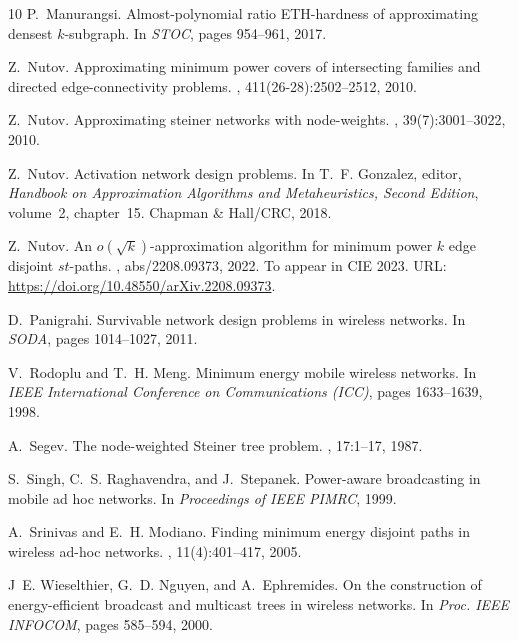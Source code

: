 \documentclass[a4paper,UKenglish,autoref]{lipics-v2019}
\begin{document}
\begin{thebibliography}{10}
P.~Manurangsi.
\newblock Almost-polynomial ratio {ETH}-hardness of approximating densest
  $k$-subgraph.
\newblock In {\em STOC}, pages 954--961, 2017.

Z.~Nutov.
\newblock Approximating minimum power covers of intersecting families and
  directed edge-connectivity problems.
, 411(26-28):2502--2512, 2010.

Z.~Nutov.
\newblock Approximating steiner networks with node-weights.
, 39(7):3001--3022, 2010.

Z.~Nutov.
\newblock Activation network design problems.
\newblock In T.~F. Gonzalez, editor, {\em Handbook on Approximation Algorithms
  and Metaheuristics, Second Edition}, volume~2, chapter~15. Chapman \&
  Hall/CRC, 2018.

Z.~Nutov.
\newblock An $o(\sqrt{k})$-approximation algorithm for minimum power $k$ edge
  disjoint $st$-paths.
, abs/2208.09373, 2022.
\newblock To appear in CIE 2023.
\newblock URL: \url{https://doi.org/10.48550/arXiv.2208.09373}.

D.~Panigrahi.
\newblock Survivable network design problems in wireless networks.
\newblock In {\em SODA}, pages 1014--1027, 2011.

V.~Rodoplu and T.~H. Meng.
\newblock Minimum energy mobile wireless networks.
\newblock In {\em IEEE International Conference on Communications (ICC)}, pages
  1633--1639, 1998.

A.~Segev.
\newblock The node-weighted {Steiner} tree problem.
, 17:1--17, 1987.

S.~Singh, C.~S. Raghavendra, and J.~Stepanek.
\newblock Power-aware broadcasting in mobile ad hoc networks.
\newblock In {\em Proceedings of IEEE PIMRC}, 1999.

A.~Srinivas and E.~H. Modiano.
\newblock Finding minimum energy disjoint paths in wireless ad-hoc networks.
, 11(4):401--417, 2005.

J~E. Wieselthier, G.~D. Nguyen, and A.~Ephremides.
\newblock On the construction of energy-efficient broadcast and multicast trees
  in wireless networks.
\newblock In {\em Proc. IEEE INFOCOM}, pages 585--594, 2000.

\end{thebibliography}
\end{document}

